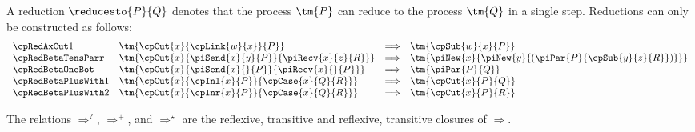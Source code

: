 \begin{definition}[Reduction]\label{def:ccp-reduction}
  A reduction $\reducesto{P}{Q}$ denotes that the process $\tm{P}$ can reduce
  to the process $\tm{Q}$ in a single step. Reductions can only be constructed
  as follows:
  \begin{gather*}
    \begin{array}{llcll}
      \cpRedAxCut1
      & \tm{\cpCut{x}{\cpLink{w}{x}}{P}}
      & \Longrightarrow
      & \tm{\cpSub{w}{x}{P}} 
      \\
      \cpRedBetaTensParr
      & \tm{\cpCut{x}{\piSend{x}{y}{P}}{\piRecv{x}{z}{R}}}
      & \Longrightarrow
      & \tm{\piNew{x}{\piNew{y}{(\piPar{P}{\cpSub{y}{z}{R}})}}}
      \\
      \cpRedBetaOneBot
      & \tm{\cpCut{x}{\piSend{x}{}{P}}{\piRecv{x}{}{P}}}
      & \Longrightarrow
      & \tm{\piPar{P}{Q}}
      \\
      \cpRedBetaPlusWith1
      & \tm{\cpCut{x}{\cpInl{x}{P}}{\cpCase{x}{Q}{R}}}
      & \Longrightarrow
      & \tm{\cpCut{x}{P}{Q}}
      \\
      \cpRedBetaPlusWith2
      & \tm{\cpCut{x}{\cpInr{x}{P}}{\cpCase{x}{Q}{R}}}
      & \Longrightarrow
      & \tm{\cpCut{x}{P}{R}}
    \end{array}
  \end{gather*}
  \begin{center}
    \begin{prooftree*}
      \SYM{\hccpRedGammaNew}
    \end{prooftree*}
    \begin{prooftree*}
      \SYM{\hccpRedGammaMix}
    \end{prooftree*}
    \begin{prooftree*}
      \SYM{\hccpRedGammaEquiv}
    \end{prooftree*}
  \end{center}
  The relations $\Longrightarrow^{?}$, $\Longrightarrow^{+}$, and
  $\Longrightarrow^\star$ are the reflexive, transitive and reflexive,
  transitive closures of $\Longrightarrow$. 
\end{definition}
